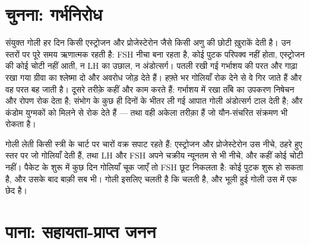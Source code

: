 \section{चुनना: गर्भनिरोध}

\begin{proposition}[हॉर्मोनी गर्भनिरोध]\label{prop:g11:hormones-and-reproduction:contraception}
संयुक्त गोली हर दिन किसी एस्ट्रोजन और प्रोजेस्टेरोन जैसे किसी अणु की छोटी
ख़ुराकें देती है। उन स्तरों पर  पूरे समय ऋणात्मक रहती है: FSH
नीचा बना रहता है, कोई पुटक परिपक्व नहीं होता, एस्ट्रोजन की कोई चोटी नहीं
आती, न LH का उछाल, न अंडोत्सर्ग। पतली रखी गई गर्भाशय की परत और गाढ़ा रखा
गया ग्रीवा का श्लेष्मा दो और अवरोध जोड़ देते हैं। हफ़्ते भर गोलियाँ रोक
देने से वे  गिर जाते हैं और वह परत बह जाती है। दूसरे तरीक़े कहीं और
काम करते हैं: गर्भाशय में रखा ताँबे का उपकरण निषेचन और रोपण रोक देता है;
संभोग के कुछ ही दिनों के भीतर ली गई आपात गोली अंडोत्सर्ग टाल देती है; और
कंडोम युग्मकों को मिलने से रोक देते हैं --- तथा वही अकेला तरीक़ा हैं जो
यौन-संचरित संक्रमण भी रोकता है।
\end{proposition}
\admitted

\begin{example}[गोली का असर पढ़ना]\label{ex:g11:hormones-and-reproduction:pill}
गोली लेती किसी स्त्री के चार्ट पर चारों वक्र सपाट रहते हैं: एस्ट्रोजन और
प्रोजेस्टेरोन उस नीचे, ठहरे हुए स्तर पर जो गोलियाँ देती हैं, तथा LH और FSH
अपने चक्रीय न्यूनतम से भी नीचे, और कहीं कोई चोटी नहीं। पैकेट के शुरू में
कुछ दिन गोलियाँ चूक जाएँ तो FSH छूट निकलता है: कोई पुटक शुरू हो सकता है,
और उसके बाद बाक़ी सब भी। गोली इसलिए चलती है कि  चलती है, और भूली
हुई गोली उस  में एक छेद है।
\end{example}

\section{पाना: सहायता-प्राप्त जनन}

